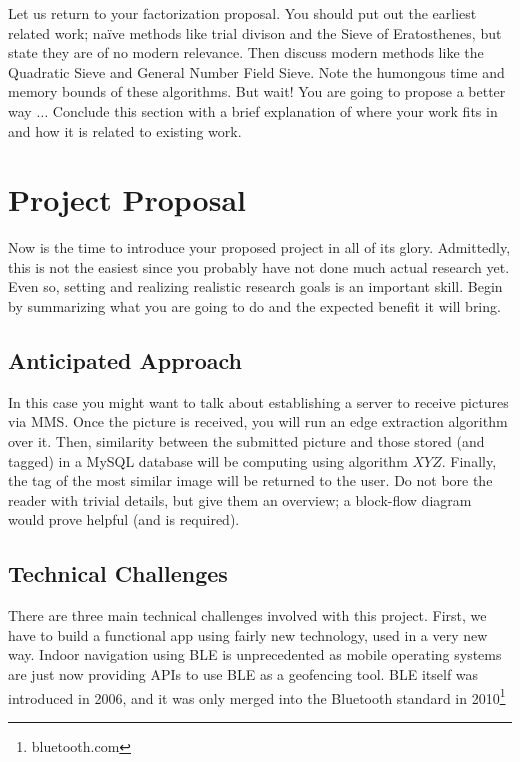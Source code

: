 \documentclass{sig-alternate}
\begin{document}
Let us return to your factorization proposal. You should put out the
earliest related work; na\"{i}ve methods like trial divison and the
Sieve of Eratosthenes, but state they are of no modern relevance. Then
discuss modern methods like the Quadratic Sieve and General Number
Field Sieve. Note the humongous time and memory bounds of these
algorithms. But wait! You are going to propose a better way $\ldots$
Conclude this section with a brief explanation of where your work fits
in and how it is related to existing work.

\section{Project Proposal}
\label{sec:project_proposal}
Now is the time to introduce your proposed project in all of its
glory. Admittedly, this is not the easiest since you probably have not
done much actual research yet. Even so, setting and realizing
realistic research goals is an important skill. Begin by summarizing
what you are going to do and the expected benefit it will bring.

\subsection{Anticipated Approach}
\label{subsec:approach}


In this case you might want to talk about establishing a server to
receive pictures via MMS. Once the picture is received, you will run
an edge extraction algorithm over it. Then, similarity between the
submitted picture and those stored (and tagged) in a MySQL database
will be computing using algorithm $XYZ$. Finally, the tag of the most
similar image will be returned to the user. Do not bore the reader
with trivial details, but give them an overview; a block-flow diagram
would prove helpful (and is required).

\subsection{Technical Challenges}
\label{subsec:tech_challenges}
There are three main technical challenges involved with this project.
First, we have to build a functional app using fairly new technology, 
used in a very new way. Indoor navigation using BLE is unprecedented 
as mobile operating systems are just now providing APIs to use BLE 
as a geofencing tool. BLE itself was introduced in 2006, and it was
only merged into the Bluetooth standard in 2010\footnote{bluetooth.com}
\end{document}
